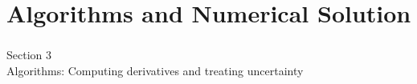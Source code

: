 \documentclass[aspectratio=169,xcolor=dvipsnames,10pt]{beamer}
\begin{document}
\section{Algorithms and Numerical Solution}

\begin{frame}\frametitle{}
\begin{center}\Large
Section 3\\
Algorithms: Computing derivatives and treating uncertainty
\end{center}\bigskip

\end{frame}



\end{document}
